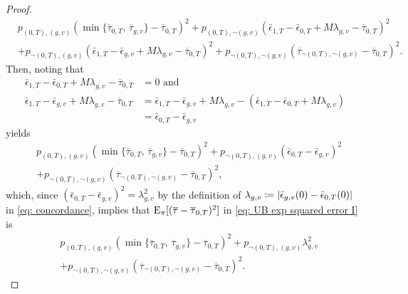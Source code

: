 \documentclass[twoside,11pt]{article}
\begin{document}
\begin{proof}
\begin{equation}
\begin{split}
& p_{(0,T),(g,v)} \left(\min\{\overline{\tau}_{0,T}, \, \overline{\tau}_{g,v}\} - \overline{\tau}_{0,T}\right)^2 + p_{(0,T),\neg(g,v)} \left(\bar{\epsilon}_{1,T} - \bar{\epsilon}_{0,T} + M \lambda_{g,v} - \overline{\tau}_{0,T}\right)^2 \\ 
& + p_{\neg(0,T),(g,v)} \left(\bar{\epsilon}_{1,T} - \bar{\epsilon}_{g,v} + M \lambda_{g,v} - \overline{\tau}_{0,T}\right)^2 + p_{\neg(0,T),\neg(g,v)} \left(\overline{\tau}_{\neg(0,T),\neg(g,v)} - \overline{\tau}_{0,T}\right)^2.
\end{split}
\end{equation}
Then, noting that 
\begin{align*}
\bar{\epsilon}_{1,T} - \bar{\epsilon}_{0,T} + M \lambda_{g,v} - \overline{\tau}_{0,T} & = 0 \text{ and} \\
\bar{\epsilon}_{1,T} - \bar{\epsilon}_{g,v} + M \lambda_{g,v} - \overline{\tau}_{0,T} & = \bar{\epsilon}_{1,T} - \bar{\epsilon}_{g,v} + M \lambda_{g,v} - \left(\bar{\epsilon}_{1,T} - \bar{\epsilon}_{0,T} + M \lambda_{g,v}\right) \\ 
& = \bar{\epsilon}_{0,T} - \bar{\epsilon}_{g,v}
\end{align*}
yields
\begin{equation*}
\begin{split}
& p_{(0,T),(g,v)} \left(\min\{\overline{\tau}_{0,T}, \, \overline{\tau}_{g,v}\} - \overline{\tau}_{0,T}\right)^2 + p_{\neg(0,T),(g,v)} \left(\bar{\epsilon}_{0,T} - \bar{\epsilon}_{g,v}\right)^2 \\ 
& + p_{\neg(0,T),\neg(g,v)} \left(\overline{\tau}_{\neg(0,T),\neg(g,v)} - \overline{\tau}_{0,T}\right)^2,
\end{split}
\end{equation*}
which, since $\left(\bar{\epsilon}_{0,T} - \bar{\epsilon}_{g,v}\right)^2 = \lambda_{g,v}^2$ by the definition of $\lambda_{g,v} \coloneqq \lvert\bar{\epsilon}_{g,v}(0) - \bar{\epsilon}_{0,T}(0)\rvert$ in \eqref{eq: concordance}, implies that $\operatorname{\rm{E}}_{\pi}[(\overline{\tau} - \overline{\tau}_{0,T})^2]$ in \eqref{eq: UB exp squared error I} is
\begin{equation} \label{eq: UB exp squared error II}
\begin{split}
& p_{(0,T),(g,v)} \left(\min\{\overline{\tau}_{0,T}, \, \overline{\tau}_{g,v}\} - \overline{\tau}_{0,T}\right)^2 + p_{\neg(0,T),(g,v)} \lambda_{g,v}^2 \\ 
& + p_{\neg(0,T),\neg(g,v)} \left(\overline{\tau}_{\neg(0,T),\neg(g,v)} - \overline{\tau}_{0,T}\right)^2.

\end{split}
\end{equation}
\end{proof}
\end{document}
